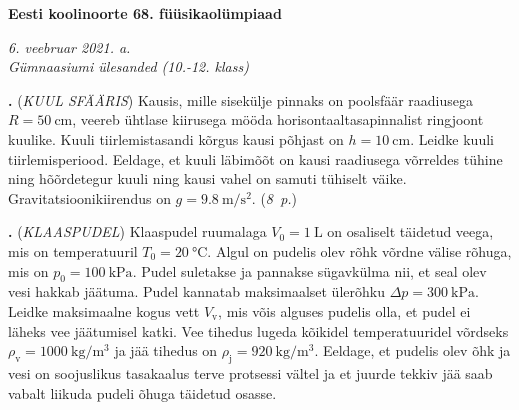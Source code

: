 \documentclass[11pt,a5paper]{article}
\newcommand{\numb}[1]{\vspace{5pt}\textbf{\large #1}}
\newcommand{\nimi}[1]{(\textsl{\small #1})}
\newcommand{\punktid}[1]{(\emph{#1~p.})}
\newcommand{\autor}[1]{}
\newcounter{ylesanne}
\newcommand{\yl}[1]{\addtocounter{ylesanne}{1}\numb{\theylesanne.} \nimi{#1} \newblock{}}
\begin{document}
\begin{center}
	\textbf{\Large Eesti koolinoorte 68. füüsikaolümpiaad} \par
	\emph{6. veebruar 2021. a. \\Gümnaasiumi ülesanded (10.-12. klass)}
\end{center}
 \par

\yl{KUUL SFÄÄRIS}
Kausis, mille sisekülje pinnaks on poolsfäär raadiusega $R=\SI{50}{\centi\meter}$, veereb ühtlase kiirusega mööda horisontaaltasapinnalist ringjoont kuulike. Kuuli tiirlemistasandi kõrgus kausi põhjast on $h=\SI{10}{\centi\meter}$. Leidke kuuli tiirlemisperiood. Eeldage, et kuuli läbimõõt on kausi raadiusega võrreldes tühine ning hõõrdetegur kuuli ning kausi vahel on samuti tühiselt väike. Gravitatsioonikiirendus on $g=\SI{9.8}{\meter\per\second\squared}$.
\punktid{8} \autor{Markus Rene Pae}

\yl{KLAASPUDEL}
Klaaspudel ruumalaga $V_0=\SI{1}{\liter}$ on osaliselt täidetud veega, mis on temperatuuril $T_0=\SI{20}{\celsius}$. Algul on pudelis olev rõhk võrdne välise rõhuga, mis on $p_0=\SI{100}{\kilo\pascal}$. Pudel suletakse ja pannakse sügavkülma nii, et seal olev vesi hakkab jäätuma. Pudel kannatab maksimaalset ülerõhku $\Delta p=\SI{300}{\kilo\pascal}$. Leidke maksimaalne kogus vett $V_{\text{v}}$, mis võis alguses pudelis olla, et pudel ei läheks vee jäätumisel katki. Vee tihedus lugeda kõikidel temperatuuridel võrdseks $\rho_{\text{v}}=\SI{1000}{\kilo\gram\per\meter\cubed}$ ja jää tihedus on $\rho_{\text{j}}=\SI{920}{\kilo\gram\per\meter\cubed}$. Eeldage, et pudelis olev õhk ja vesi on soojuslikus tasakaalus terve protsessi vältel ja et juurde tekkiv jää saab vabalt liikuda pudeli õhuga täidetud osasse.
\end{document}

